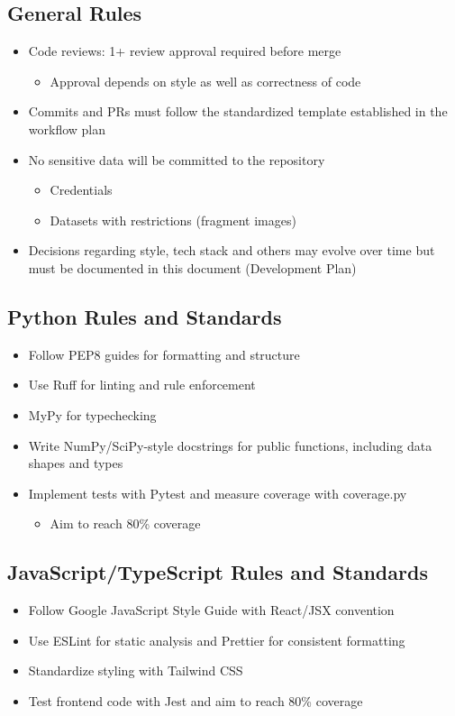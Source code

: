 \documentclass{article}
\begin{document}
\subsection*{General Rules}
\begin{itemize}
    \item Code reviews: 1+ review approval required before merge
    \begin{itemize}
        \item Approval depends on style as well as correctness of code
    \end{itemize}
    \item Commits and PRs must follow the standardized template established in the workflow plan
    \item No sensitive data will be committed to the repository
    \begin{itemize}
        \item Credentials
        \item Datasets with restrictions (fragment images)
    \end{itemize}
    \item Decisions regarding style, tech stack and others may evolve over time but must be documented in this document (Development Plan)
\end{itemize}

\subsection*{Python Rules and Standards}
\begin{itemize}
    \item Follow PEP8 guides for formatting and structure
    \item Use Ruff for linting and rule enforcement
    \item MyPy for typechecking
    \item Write NumPy/SciPy-style docstrings for public functions, including data shapes and types
    \item Implement tests with Pytest and measure coverage with coverage.py
    \begin{itemize}
        \item Aim to reach 80\% coverage
    \end{itemize}
\end{itemize}

\subsection*{JavaScript/TypeScript Rules and Standards}
\begin{itemize}
    \item Follow Google JavaScript Style Guide with React/JSX convention
    \item Use ESLint for static analysis and Prettier for consistent formatting
    \item Standardize styling with Tailwind CSS
    \item Test frontend code with Jest and aim to reach 80\% coverage
\end{itemize}
\end{document}
